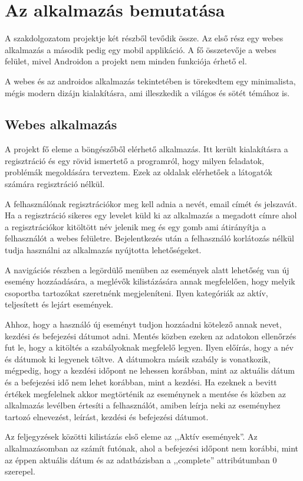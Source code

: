\documentclass[
]{thesis-ekf}
\theoremstyle{definition}
\theoremstyle{remark}
\begin{document}
\chapter{Az alkalmazás bemutatása}
A szakdolgozatom projektje két részből tevődik össze. Az első rész egy webes alkalmazás a második pedig egy mobil applikáció. A fő összetevője a webes felület, mivel Androidon a projekt nem minden funkciója érhető el. 

A webes és az androidos alkalmazás tekintetében is törekedtem egy minimalista, mégis modern dizájn kialakításra, ami illeszkedik a világos és sötét témához is.
\section{Webes alkalmazás}
A projekt fő eleme a böngészőből elérhető alkalmazás. Itt került kialakításra a regisztráció és egy rövid ismertető a programról, hogy milyen feladatok, problémák megoldására terveztem. Ezek az oldalak elérhetőek a látogatók számára regisztráció nélkül. 

A felhasználónak regisztrációkor meg kell adnia a nevét, email címét és jelszavát. Ha a regisztráció sikeres egy levelet küld ki az alkalmazás a megadott címre ahol a regisztrációkor kitöltött név jelenik meg és egy gomb ami átirányítja a felhasználót a webes felületre. Bejelentkezés után a felhasználó korlátozás nélkül tudja használni az alkalmazás nyújtotta lehetőségeket. 

A navigációs részben a legördülő menüben az események alatt lehetőség van új esemény hozzáadására, a meglévők kilistázására annak megfelelően, hogy melyik csoportba tartozókat szeretnénk megjeleníteni. Ilyen kategóriák az aktív, teljesített és lejárt események. 

Ahhoz, hogy a használó új eseményt tudjon hozzáadni kötelező annak nevet, kezdési és befejezési dátumot adni. Mentés közben ezeken az adatokon ellenőrzés fut le, hogy a kitöltés a szabályoknak megfelelő legyen. Ilyen előírás, hogy a név és dátumok ki legyenek töltve. A dátumokra másik szabály is vonatkozik, mégpedig, hogy a kezdési időpont ne lehessen korábban, mint az aktuális dátum és a befejezési idő nem lehet korábban, mint a kezdési. Ha ezeknek a bevitt értékek megfelelnek akkor megtörténik az eseménynek a mentése és közben az alkalmazás levélben értesíti a felhasználót, amiben leírja neki az eseményhez tartozó elnevezést, leírást, kezdési és befejezési dátumot. 

Az feljegyzések közötti kilistázás első eleme az ,,Aktív események''. Az alkalmazásomban az számít futónak, ahol a befejezési időpont nem korábbi, mint az éppen aktuális dátum és az adatbázisban a ,,complete''  attribútumban 0 szerepel.
\end{document}
